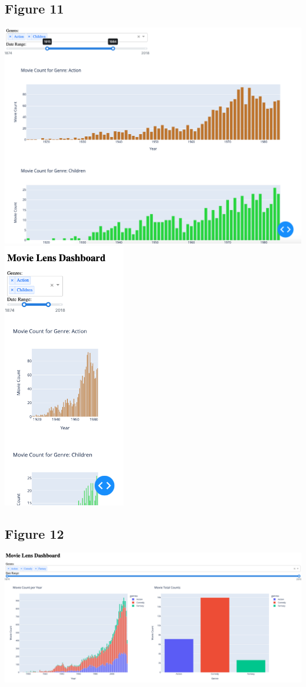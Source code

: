 \documentclass{article}
\begin{document}
\subsection{Figure 11}
\includegraphics[width=1\textwidth]{img/dashboard_updated.png}\\
\includegraphics[width=0.4\textwidth]{img/dashboard_mobile.png}

\subsection{Figure 12}
\includegraphics[width=1\textwidth]{img/dashboard_redesign.png}
  
\end{document}

